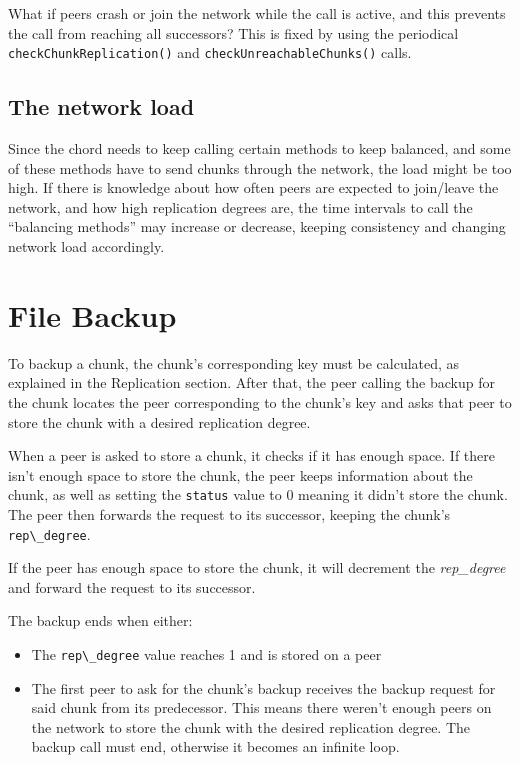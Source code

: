 \documentclass[11pt]{article}
\begin{document}
What if peers crash or join the network while the call is active, and this prevents the call from reaching all successors? This is fixed by using the periodical \verb|checkChunkReplication()| and \verb|checkUnreachableChunks()| calls.

\subsection{The network load}
Since the chord needs to keep calling certain methods to keep balanced, and some of these methods have to send chunks through the network, the load might be too high. If there is knowledge about how often peers are expected to join/leave the network, and how high replication degrees are, the time intervals to call the ``balancing methods'' may increase or decrease, keeping consistency and changing network load accordingly. 

\section{File Backup}
To backup a chunk, the chunk's corresponding key must be calculated, as explained in the Replication section. After that, the peer calling the backup for the chunk locates the peer corresponding to the chunk's key and asks that peer to store the chunk with a desired replication degree.

When a peer is asked to store a chunk, it checks if it has enough space. If there isn't enough space to store the chunk, the peer keeps information about the chunk, as well as setting the \verb|status| value to 0 meaning it didn't store the chunk. The peer then forwards the request to its successor, keeping the chunk's \verb|rep\_degree|. 

If the peer has enough space to store the chunk, it will decrement the \textit{rep\_degree} and forward the request to its successor.

The backup ends when either:
\begin{itemize}
\item The \verb|rep\_degree| value reaches 1 and is stored on a peer
\item The first peer to ask for the chunk's backup receives the backup request for said chunk from its predecessor. This means there weren't enough peers on the network to store the chunk with the desired replication degree. The backup call must end, otherwise it becomes an infinite loop.
\end{itemize}
\end{document}
